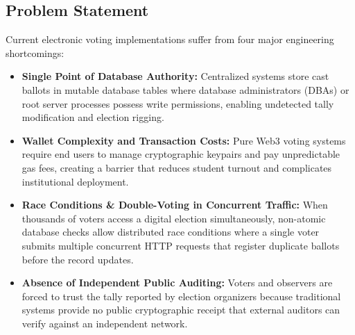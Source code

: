 \documentclass[12pt, a4paper]{article}
\begin{document}
\subsection{Problem Statement}
Current electronic voting implementations suffer from four major engineering shortcomings:
\begin{itemize}[leftmargin=*]
    \item \textbf{Single Point of Database Authority:} Centralized systems store cast ballots in mutable database tables where database administrators (DBAs) or root server processes possess write permissions, enabling undetected tally modification and election rigging.
    \item \textbf{Wallet Complexity and Transaction Costs:} Pure Web3 voting systems require end users to manage cryptographic keypairs and pay unpredictable gas fees, creating a barrier that reduces student turnout and complicates institutional deployment.
    \item \textbf{Race Conditions \& Double-Voting in Concurrent Traffic:} When thousands of voters access a digital election simultaneously, non-atomic database checks allow distributed race conditions where a single voter submits multiple concurrent HTTP requests that register duplicate ballots before the record updates.
    \item \textbf{Absence of Independent Public Auditing:} Voters and observers are forced to trust the tally reported by election organizers because traditional systems provide no public cryptographic receipt that external auditors can verify against an independent network.
\end{itemize}
\end{document}
